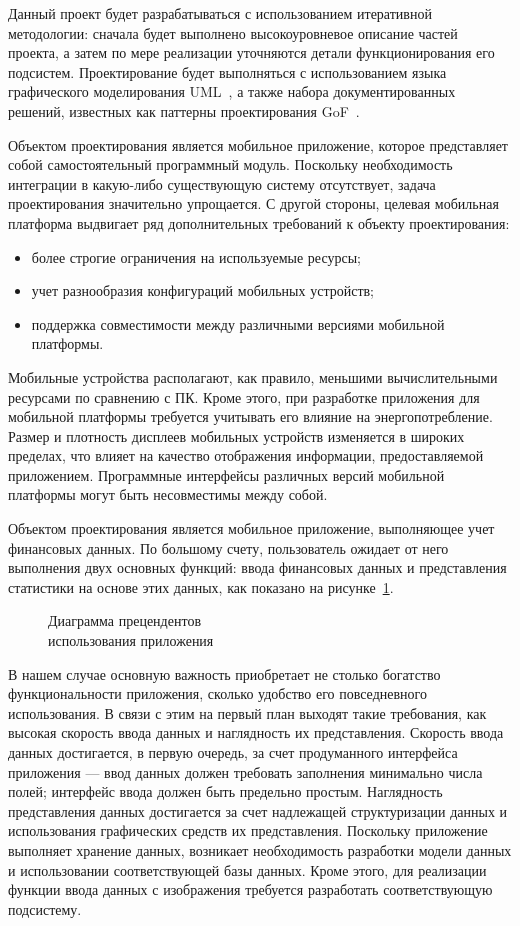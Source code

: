 Данный проект будет разрабатываться с использованием итеративной методологии:
сначала будет выполнено высокоуровневое описание частей проекта,
а затем по мере реализации уточняются детали функционирования его подсистем.
Проектирование будет выполняться с использованием языка графического
моделирования UML~\cite{fowler04}, а также набора документированных решений,
известных как паттерны проектирования GoF~\cite{gamma01}.

Объектом проектирования является мобильное приложение,
которое представляет собой самостоятельный программный модуль.
Поскольку необходимость интеграции в какую-либо существующую
систему отсутствует, задача проектирования значительно упрощается.
С другой стороны, целевая мобильная платформа выдвигает ряд дополнительных
требований к объекту проектирования:
\begin{itemize}
\item более строгие ограничения на используемые ресурсы;
\item учет разнообразия конфигураций мобильных устройств;
\item поддержка совместимости между различными версиями
  мобильной платформы.
\end{itemize}

Мобильные устройства располагают, как правило, меньшими вычислительными
ресурсами по сравнению с ПК. Кроме этого, при разработке приложения для
мобильной платформы требуется учитывать его влияние на энергопотребление.
Размер и плотность дисплеев мобильных устройств изменяется в широких пределах,
что влияет на качество отображения информации, предоставляемой приложением.
Программные интерфейсы различных версий мобильной платформы
могут быть несовместимы между собой.

Объектом проектирования является мобильное приложение,
выполняющее учет финансовых данных. По большому счету, пользователь
ожидает от него выполнения двух основных функций:
ввода финансовых данных и представления статистики на основе этих данных,
как показано на рисунке~\ref{fig:use_cases}.

\begin{figure}[h!]
  \centering
  \caption{Диаграмма прецендентов \\ использования приложения}
  \label{fig:use_cases}
\end{figure}

В нашем случае основную важность приобретает не столько богатство
функциональности приложения, сколько удобство его повседневного использования.
В связи с этим на первый план выходят такие требования, как
высокая скорость ввода данных и наглядность их представления.
Скорость ввода данных достигается, в первую очередь, за счет
продуманного интерфейса приложения ---
ввод данных должен требовать заполнения минимально числа полей;
интерфейс ввода должен быть предельно простым.
Наглядность представления данных достигается за счет надлежащей
структуризации данных и использования графических средств их представления.
Поскольку приложение выполняет хранение данных, возникает необходимость
разработки модели данных и использовании соответствующей базы данных.
Кроме этого, для реализации функции ввода данных с изображения
требуется разработать соответствующую подсистему.

